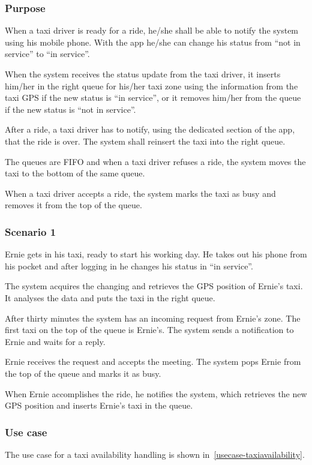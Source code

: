 \label{taxi-availability}
\subsubsection{Purpose}

When a taxi driver is ready for a ride, he/she shall be able to notify the system using his mobile phone. With the app he/she can change his status from ``not in service'' to ``in service''.

When the system receives the status update from the taxi driver, it inserts him/her in the right queue for his/her taxi zone using the information from the taxi GPS if the new status is ``in service'', or it removes him/her from the queue if the new status is ``not in service''.

After a ride, a taxi driver has to notify, using the dedicated section of the app, that the ride is over. The system shall reinsert the taxi into the right queue.

The queues are FIFO and when a taxi driver refuses a ride, the system moves the taxi to the bottom of the same queue.

When a taxi driver accepts a ride, the system marks the taxi as busy and removes it from the top of the queue.

\subsubsection{Scenario 1}
Ernie gets in his taxi, ready to start his working day. He takes out his phone from his pocket and after logging in he changes his status in ``in service''.

The system acquires the changing and retrieves the GPS position of Ernie's taxi. It analyses the data and puts the taxi in the right queue.

After thirty minutes the system has an incoming request from Ernie's zone. The first taxi on the top of the queue is Ernie's. The system sends a notification to Ernie and waits for a reply.

Ernie receives the request and accepts the meeting. The system pops Ernie from the top of the queue and marks it as busy.

When Ernie accomplishes the ride, he notifies the system, which retrieves the new GPS position and inserts Ernie's taxi in the queue.

\subsubsection{Use case}
The use case for a taxi availability handling is shown in~\autoref{usecase-taxiavailability}.

